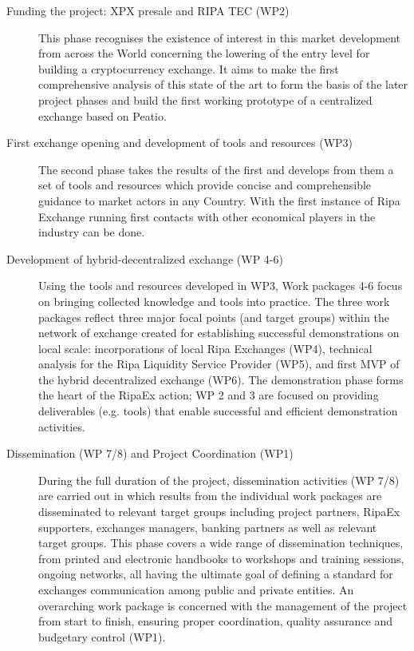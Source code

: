 \documentclass[11pt,fleqn,oneside]{book} %
\begin{document}
\begin{description}
	\item[Funding the project: XPX presale and RIPA TEC (WP2)] This phase recognises the existence of interest in this market development
	from across the World concerning the lowering of the entry level for building a cryptocurrency exchange.
	It aims to make the first comprehensive analysis of this state of the art to form the basis of the later project phases and
	build the first working prototype of a centralized exchange based on Peatio.    
	\item[First exchange opening and development of tools and resources (WP3)] The second phase takes the results of the first 
	and develops from them a set of tools and resources which provide concise and comprehensible guidance to market actors in any
	Country. With the first instance of Ripa Exchange running first contacts with other economical players in the industry can be
	done.
	\item[Development of hybrid-decentralized exchange (WP 4-6)] Using the tools and resources developed in WP3, 
	Work packages 4-6 focus on bringing collected knowledge and tools into practice. The three work packages reflect three major
	focal points (and target groups) within the network of exchange created for establishing successful 
	demonstrations on local scale: incorporations of local Ripa Exchanges (WP4), technical analysis for the 
	Ripa Liquidity Service Provider (WP5), and first MVP of the hybrid decentralized exchange (WP6). The demonstration
    phase forms the heart of the RipaEx action; WP 2 and 3 are focused on providing
    deliverables (e.g. tools) that enable successful and efficient demonstration activities.    
	\item[Dissemination (WP 7/8) and Project Coordination (WP1)] During the full duration of the project, 
	dissemination activities (WP 7/8) are carried out in which results from the individual work packages are disseminated 
	to relevant target groups including project partners, RipaEx supporters, exchanges managers, banking partners as well 
	as relevant target groups. This phase covers a wide range of dissemination techniques, from printed and
    electronic handbooks to workshops and training sessions, ongoing networks, all having the
	ultimate goal of defining a standard for exchanges communication among public and private entities. 
	An overarching work package is concerned with the management of the project from start to finish, ensuring proper coordination, 
	quality assurance and budgetary control (WP1).
\end{description}
\end{document}
